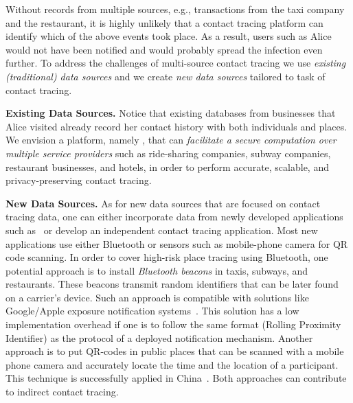 Without records from multiple sources, e.g., transactions from the taxi company and the restaurant, it is highly unlikely that a contact tracing platform can identify which of the above events took place. As a result, users such as  Alice would not have been notified and would probably spread the infection even further. 
To address the challenges of multi-source contact tracing we use \emph{existing (traditional) data sources} and we create \emph{new data sources} tailored to task of contact tracing. 

\textbf{Existing Data Sources.} 
Notice that existing databases from businesses that Alice visited already record her contact history with both individuals and places. We envision a platform, namely \sysname, that can \emph{facilitate a secure computation over multiple service providers} such as ride-sharing companies, subway companies, restaurant businesses, and hotels, in order to perform accurate, scalable, and privacy-preserving contact tracing. 


\textbf{New Data Sources.} As for new data sources that are focused on contact tracing data, one  can either incorporate data from newly developed applications such as~\cite{apple-google-ppct} or develop an independent contact tracing application.  
Most new applications use either Bluetooth or sensors such as mobile-phone camera for QR code scanning. 
In order to cover high-risk place tracing using Bluetooth, one potential approach is to install \emph{Bluetooth beacons} in taxis, subways, and restaurants. These beacons transmit random identifiers that can be later found on a carrier's device. 
Such an approach is compatible with solutions like Google/Apple exposure notification systems~\cite{apple-google-ppct}. This solution has a low implementation overhead if one is to follow the same format (Rolling Proximity Identifier) as the protocol of a deployed notification mechanism. Another approach is to put QR-codes in public places that can be scanned with a mobile phone camera and accurately locate the time and the location of a participant.  
This technique is successfully applied in China~\cite{China-qrcode}. Both approaches can contribute to indirect contact tracing.

